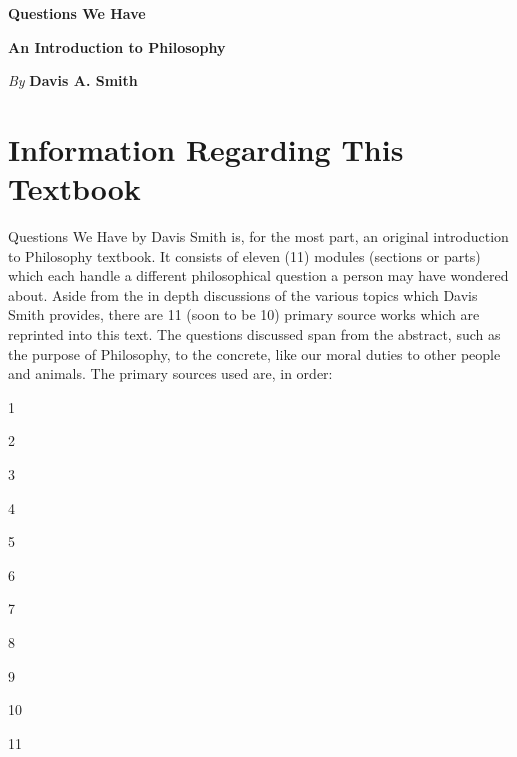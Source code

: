 \thispagestyle{empty}

\pagestyle{empty}

\vspace*{80pt}

\begin{raggedleft}
\fontsize{30pt}{24pt}\sffamily
\selectfont
  \textbf{Questions We Have }

\medskip\fontsize{18pt}{20pt}\selectfont

\textbf{An Introduction to Philosophy}

\vfill
\fontsize{12pt}{16pt}\selectfont \textit{By }  \textbf{Davis A. Smith}\\
\end{raggedleft}

\newpage

\noindent%
\section*{Information Regarding This Textbook}
Questions We Have by Davis Smith is, for the most part, an original introduction to Philosophy textbook. It consists of eleven (11) modules (sections or parts) which each handle a different philosophical question a person may have wondered about. Aside from the in depth discussions of the various topics which Davis Smith provides, there are 11 (soon to be 10) primary source works which are reprinted into this text. The questions discussed span from the abstract, such as the purpose of Philosophy, to the concrete, like our moral duties to other people and animals. 
The primary sources used are, in order:
\begin{earg}
\item[1] 
\item[2] 
\item[3] 
\item[4] 
\item[5] 
\item[6] 
\item[7] 
\item[8] 
\item[9] 
\item[10]  
\item[11]  
\end{earg}

